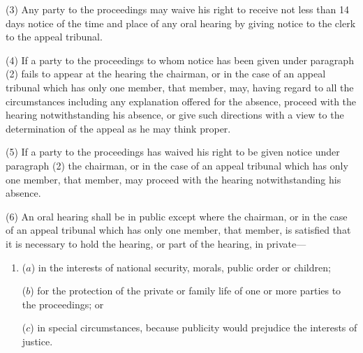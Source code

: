 \documentclass[12pt,a4paper]{article}
\begin{document}
(3) Any party to the proceedings may waive his right to receive not less than 14 days notice of the time and place of any oral hearing by giving notice to the clerk to the appeal tribunal.

(4) If a party to the proceedings to whom notice has been given under paragraph (2) fails to appear at the hearing the chairman, or in the case of an appeal tribunal which has only one member, that member, may, having regard to all the circumstances including any explanation offered for the absence, proceed with the hearing notwithstanding his absence, or give such directions with a view to the determination of the appeal as he may think proper.

(5) If a party to the proceedings has waived his right to be given notice under paragraph (2) the chairman, or in the case of an appeal tribunal which has only one member, that member, may proceed with the hearing notwithstanding his absence.

%

(6) An oral hearing shall be in public except where the chairman, or in the case of an appeal tribunal which has only one member, that member, is satisfied that it is necessary to hold the hearing, or part of the hearing, in private—
\begin{enumerate}\item[]
($a$) in the interests of national security, morals, public order or children;

($b$) for the protection of the private or family life of one or more parties to the proceedings; or

($c$) in special circumstances, because publicity would prejudice the interests of justice.
\end{enumerate}

\end{document}

